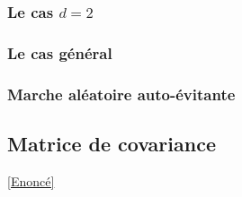 \documentclass[8pt]{book}
\begin{document}
	\subsubsection{Le cas $d=2$}
	
	
	\subsubsection{Le cas général}
	
	
	\subsubsection{Marche aléatoire auto-évitante}
	
	
	\subsection{Matrice de covariance }
	\label{Matrice de covariance corrigé}
		\textcolor{blue}{\hyperref[Matrice de covariances]{[Enoncé]}}\\
\end{document}
